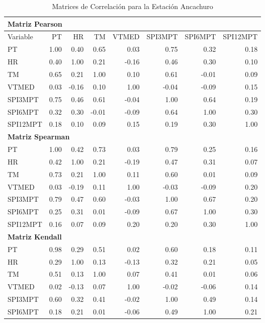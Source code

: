\begin{table}[ht]
\centering
\caption{Matrices de Correlación para la Estación Ancachuro}
\begin{tabular}{lrrrrrrr}
\toprule
\multicolumn{8}{l}{\textbf{Matriz Pearson}} \\
\midrule
Variable & PT & HR & TM & VTMED & SPI3MPT & SPI6MPT & SPI12MPT \\
\midrule
PT       & 1.00 & 0.40 & 0.65 & 0.03 & 0.75 & 0.32 & 0.18 \\
HR       & 0.40 & 1.00 & 0.21 & -0.16 & 0.46 & 0.30 & 0.10 \\
TM       & 0.65 & 0.21 & 1.00 & 0.10 & 0.61 & -0.01 & 0.09 \\
VTMED    & 0.03 & -0.16 & 0.10 & 1.00 & -0.04 & -0.09 & 0.15 \\
SPI3MPT  & 0.75 & 0.46 & 0.61 & -0.04 & 1.00 & 0.64 & 0.19 \\
SPI6MPT  & 0.32 & 0.30 & -0.01 & -0.09 & 0.64 & 1.00 & 0.30 \\
SPI12MPT & 0.18 & 0.10 & 0.09 & 0.15 & 0.19 & 0.30 & 1.00 \\
\midrule
\multicolumn{8}{l}{\textbf{Matriz Spearman}} \\
\midrule
PT       & 1.00 & 0.42 & 0.73 & 0.03 & 0.79 & 0.25 & 0.16 \\
HR       & 0.42 & 1.00 & 0.21 & -0.19 & 0.47 & 0.31 & 0.07 \\
TM       & 0.73 & 0.21 & 1.00 & 0.11 & 0.60 & 0.01 & 0.09 \\
VTMED    & 0.03 & -0.19 & 0.11 & 1.00 & -0.03 & -0.09 & 0.20 \\
SPI3MPT  & 0.79 & 0.47 & 0.60 & -0.03 & 1.00 & 0.67 & 0.20 \\
SPI6MPT  & 0.25 & 0.31 & 0.01 & -0.09 & 0.67 & 1.00 & 0.30 \\
SPI12MPT & 0.16 & 0.07 & 0.09 & 0.20 & 0.20 & 0.30 & 1.00 \\
\midrule
\multicolumn{8}{l}{\textbf{Matriz Kendall}} \\
\midrule
PT       & 0.98 & 0.29 & 0.51 & 0.02 & 0.60 & 0.18 & 0.11 \\
HR       & 0.29 & 1.00 & 0.13 & -0.13 & 0.32 & 0.21 & 0.05 \\
TM       & 0.51 & 0.13 & 1.00 & 0.07 & 0.41 & 0.01 & 0.06 \\
VTMED    & 0.02 & -0.13 & 0.07 & 1.00 & -0.02 & -0.06 & 0.14 \\
SPI3MPT  & 0.60 & 0.32 & 0.41 & -0.02 & 1.00 & 0.49 & 0.14 \\
SPI6MPT  & 0.18 & 0.21 & 0.01 & -0.06 & 0.49 & 1.00 & 0.21 \\

\end{tabular}
\end{table}
